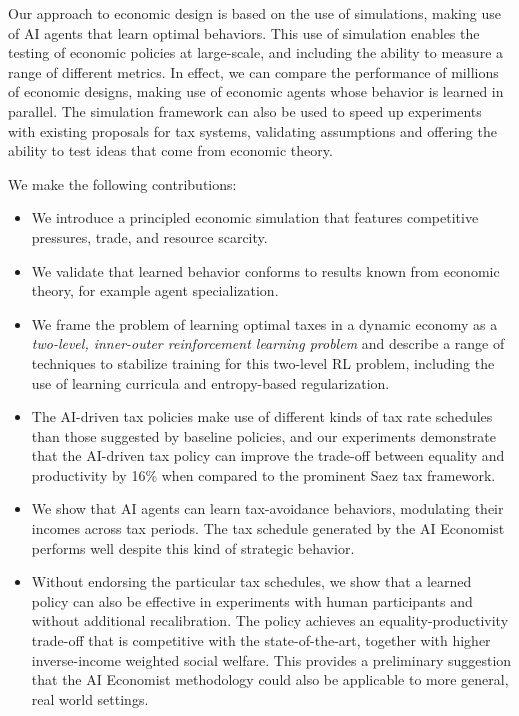 Our approach to economic design is based on the use of   simulations, making use of AI agents that learn optimal behaviors.
This use of  simulation enables the testing of economic policies at large-scale, and including the ability to measure a range of different metrics.
In effect, we can  compare the performance of millions of economic designs, making use of economic agents whose behavior is learned in parallel.
The simulation framework can also be used to speed up experiments with existing proposals for tax systems, validating assumptions and offering the ability to test ideas that come from  economic theory. 

We make the following contributions:

\begin{itemize}
  \item We introduce a principled economic simulation that features competitive pressures, trade, and resource scarcity.
  \item We validate that learned  behavior conforms to results known from economic theory, for example agent specialization.
  \item We frame the problem of learning optimal taxes in a dynamic economy as a \emph{two-level, inner-outer reinforcement learning problem} and   describe a range of techniques to stabilize training for this two-level RL problem, including the use of learning curricula and entropy-based regularization.
  \item The AI-driven tax policies make use of different kinds of tax rate schedules than those suggested by baseline policies, and our experiments demonstrate that the AI-driven tax policy can improve the trade-off between equality and productivity by 16\% when compared to the prominent Saez tax framework.
  \item We show that AI agents can learn tax-avoidance behaviors, modulating their incomes across tax periods. The tax schedule generated by the AI Economist performs well despite this kind of strategic behavior.
  \item Without endorsing the particular tax schedules, we show that a learned policy can also be effective in experiments with human participants and without additional recalibration. The policy achieves an equality-productivity trade-off that is competitive with the state-of-the-art, together with higher inverse-income weighted social welfare. This provides a preliminary suggestion that the AI Economist methodology could also be applicable to more general, real world settings.
\end{itemize}

